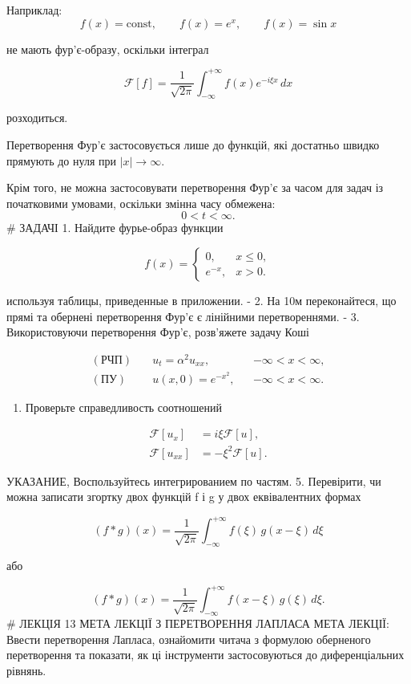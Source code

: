 \documentclass[
  ukrainian,
]{article}
\providecommand{\tightlist}{%
  \setlength{\itemsep}{0pt}\setlength{\parskip}{0pt}}
\begin{document}
Наприклад: \[
f(x)=\text{const}, \qquad f(x)=e^x, \qquad f(x)=\sin x
\]

не мають фур'є-образу, оскільки інтеграл

\[
\mathcal{F}[f] = \frac{1}{\sqrt{2\pi}} \int_{-\infty}^{+\infty} f(x)e^{-i\xi x}\,dx
\]

розходиться.

Перетворення Фур'є застосовується лише до функцій, які достатньо швидко
прямують до нуля при \(|x|\to\infty\).

Крім того, не можна застосовувати перетворення Фур'є за часом для задач
із початковими умовами, оскільки змінна часу обмежена: \[
0 < t < \infty.
\] \# ЗАДАЧІ 1. Найдите фурье-образ функции

\[
f(x)=
\begin{cases}
0, & x \le 0, \\
e^{-x}, & x > 0.
\end{cases}
\]

используя таблицы, приведенные в приложении. - 2. На 10м переконайтеся,
що прямі та обернені перетворення Фур'є є лінійними перетвореннями. - 3.
Використовуючи перетворення Фур'є, розв'яжете задачу Коші

\[
\begin{aligned}
(\text{РЧП})\quad & u_t = \alpha^2 u_{xx}, && -\infty < x < \infty,\\
(\text{ПУ})\quad & u(x,0)=e^{-x^2}, && -\infty < x < \infty.
\end{aligned}
\]

\begin{enumerate}
\def\labelenumi{\arabic{enumi}.}
\setcounter{enumi}{3}
\tightlist
\item
  Проверьте справедливость соотношений
\end{enumerate}

\[
\begin{aligned}
\mathcal{F}\left[u_{x}\right] &= i\xi \mathcal{F}\left[u\right], \\
\mathcal{F}\left[u_{xx}\right] &= -\xi^{2} \mathcal{F}\left[u\right].
\end{aligned}
\]

УКАЗАНИЕ, Воспользуйтесь интегрированием по частям. 5. Перевірити, чи
можна записати згортку двох функцій f і g у двох еквівалентних формах

\[
(f * g)(x) = \frac{1}{\sqrt{2\pi}} \int_{-\infty}^{+\infty} f(\xi)\, g(x - \xi)\, d\xi
\]

або

\[
(f * g)(x) = \frac{1}{\sqrt{2\pi}} \int_{-\infty}^{+\infty} f(x-\xi)\, g(\xi)\, d\xi.
\] \# ЛЕКЦІЯ 13 МЕТА ЛЕКЦІЇ З ПЕРЕТВОРЕННЯ ЛАПЛАСА МЕТА ЛЕКЦІЇ: Ввести
перетворення Лапласа, ознайомити читача з формулою оберненого
перетворення та показати, як ці інструменти застосовуються до
диференціальних рівнянь.
\end{document}
